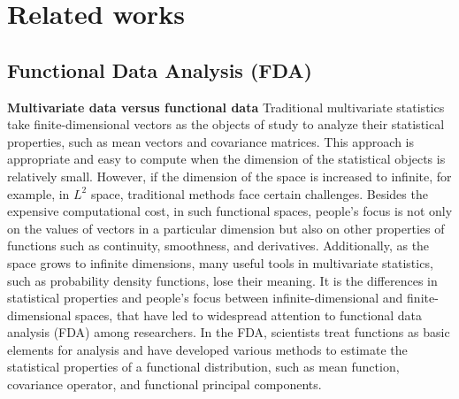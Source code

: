 \documentclass{article}
\begin{document}
\section{Related works}

\subsection{Functional Data Analysis (FDA)}

\textbf{Multivariate data versus functional data} 
Traditional multivariate statistics take finite-dimensional vectors as the objects of study to analyze their statistical properties, such as mean vectors and covariance matrices. 
This approach is appropriate and easy to compute when the dimension of the statistical objects is relatively small. 
However, if the dimension of the space is increased to infinite, for example, in $L^2$ space, traditional methods face certain challenges. 
Besides the expensive computational cost, in such functional spaces, people's focus is not only on the values of vectors in a particular dimension but also on other properties of functions such as continuity, smoothness, and derivatives. 
Additionally, as the space grows to infinite dimensions, many useful tools in multivariate statistics, such as probability density functions, lose their meaning. 
It is the differences in statistical properties and people's focus between infinite-dimensional and finite-dimensional spaces, that have led to widespread attention to functional data analysis (FDA) \cite{wang2016functional,kokoszka2017introduction} among researchers.
In the FDA, scientists treat functions as basic elements for analysis and have developed various methods to estimate the statistical properties of a functional distribution, such as mean function, covariance operator, and functional principal components.
\end{document}
